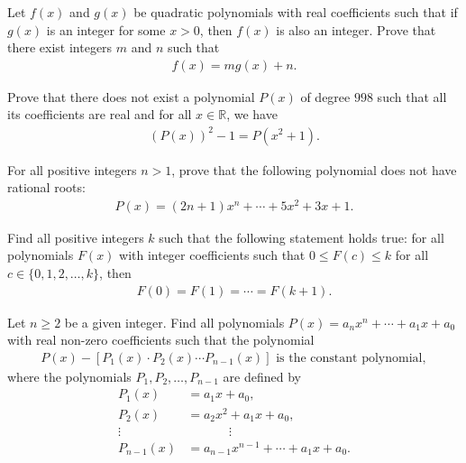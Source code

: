 \begin{question}[name={1996 Bulgaria}]
    Let $f(x)$ and $g(x)$ be quadratic polynomials with real coefficients such that if $g(x)$ is an integer for some $x>0$, then $f(x)$ is also an integer. Prove that there exist integers $m$ and $n$ such that
    \begin{align*}
        f(x)=mg(x)+n.
    \end{align*}
\end{question}




\begin{question}[name={1996 Austrian--Polish}]
    Prove that there does not exist a polynomial $P(x)$ of degree $998$ such that all its coefficients are real and for all $x\in\mathbb R$, we have
    \begin{align*}
        (P(x))^2-1 = P(x^2+1).
    \end{align*}
\end{question}

\begin{question}
    For all positive integers $n>1$, prove that the following polynomial does not have rational roots:
    \begin{align*}
        P(x)= (2n+1)x^n + \cdots + 5x^2 + 3x + 1.
    \end{align*}
\end{question}

\begin{question}[name={1997 IMO Shortlist}]
    Find all positive integers $k$ such that the following statement holds true: for all polynomials $F(x)$ with integer coefficients such that $0 \leq F(c) \leq k$ for all $c \in \{0,1,2,\dots,k\}$, then
    \begin{align*}
        F(0)=F(1)=\cdots = F(k+1).
    \end{align*}
\end{question}



\begin{question}[name={1996 Romania}]
    Let $n\geq 2$ be a given integer. Find all polynomials $P(x) = a_nx^n+\cdots+a_1x+a_0$ with real non-zero coefficients such that the polynomial
    \begin{align*}
        P(x) - [P_1(x)\cdot P_2(x) \cdots P_{n-1}(x)] \text{ is the constant polynomial},
    \end{align*}
    where the polynomials $P_1,P_2,\dots,P_{n-1}$ are defined by
    \begin{align*}
        P_1(x) &= a_1x + a_0,\\
        P_2(x) &= a_2x^2+a_1x+a_0,\\
        \vdots &\phantom{=} \qquad \vdots\\
        P_{n-1}(x) &= a_{n-1}x^{n-1} + \cdots + a_1x+a_0.
    \end{align*}
\end{question}

